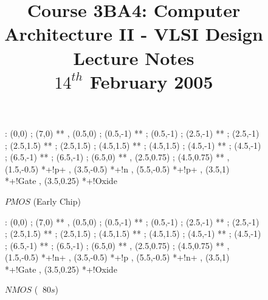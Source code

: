 \documentclass[a4paper,12pt]{article}
\begin{document}
\title{Course 3BA4: Computer Architecture II - VLSI Design \\ Lecture Notes \\ $14^{th}$ February 2005}

\maketitle

\begin{figure}[ht]



\end{figure}

\begin{figure}[ht]

\xy<1cm,0cm>:
(0,0)     ; (7,0) **\dir{-} ,
(0.5,0)   ; (0.5,-1) **\dir{-} ;
(0.5,-1)  ; (2.5,-1) **\dir{-} ;
(2.5,-1)  ; (2.5,1.5) **\dir{-} ;
(2.5,1.5) ; (4.5,1.5) **\dir{-} ;
(4.5,1.5) ; (4.5,-1) **\dir{-} ;
(4.5,-1)  ; (6.5,-1) **\dir{-} ;
(6.5,-1)  ; (6.5,0) **\dir{-} ,
%
(2.5,0.75) ; (4.5,0.75) **\dir{-} ,
%
\POS (1.5,-0.5) *+!{p+} ,
\POS (3.5,-0.5) *+!{n} ,
\POS (5.5,-0.5) *+!{p+} ,
\POS (3.5,1)    *+!{Gate} ,
\POS (3.5,0.25) *+!{Oxide}
\endxy

\caption{$PMOS$ (Early Chip)}

\end{figure}


\begin{figure}[ht]

\xy<1cm,0cm>:
(0,0)     ; (7,0) **\dir{-} ,
(0.5,0)   ; (0.5,-1) **\dir{-} ;
(0.5,-1)  ; (2.5,-1) **\dir{-} ;
(2.5,-1)  ; (2.5,1.5) **\dir{-} ;
(2.5,1.5) ; (4.5,1.5) **\dir{-} ;
(4.5,1.5) ; (4.5,-1) **\dir{-} ;
(4.5,-1)  ; (6.5,-1) **\dir{-} ;
(6.5,-1)  ; (6.5,0) **\dir{-} ,
%
(2.5,0.75) ; (4.5,0.75) **\dir{-} ,
%
\POS (1.5,-0.5) *+!{n+} ,
\POS (3.5,-0.5) *+!{p} ,
\POS (5.5,-0.5) *+!{n+} ,
\POS (3.5,1)    *+!{Gate} ,
\POS (3.5,0.25) *+!{Oxide}
\endxy

\caption{$NMOS$ ($~$ $80s$)}

\end{figure}

\vspace{10mm}
\end{document}
